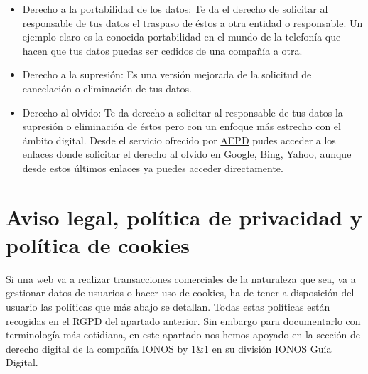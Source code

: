 \documentclass[
  spanish,
  a4paper,
  openany]{book}
\begin{document}
\begin{itemize}
\item
  Derecho a la portabilidad de los datos: Te da el derecho de solicitar al responsable de tus datos el traspaso de éstos a otra entidad o responsable. Un ejemplo claro es la conocida portabilidad en el mundo de la telefonía que hacen que tus datos puedas ser cedidos de una compañía a otra.
\item
  Derecho a la supresión: Es una versión mejorada de la solicitud de cancelación o eliminación de tus datos.
\item
  Derecho al olvido: Te da derecho a solicitar al responsable de tus datos la supresión o eliminación de éstos pero con un enfoque más estrecho con el ámbito digital. Desde el servicio ofrecido por \href{https://www.aepd.es/es/areas-de-actuacion/internet-y-redes-sociales/derecho-al-olvido}{AEPD} pudes acceder a los enlaces donde solicitar el derecho al olvido en \href{https://www.google.com/webmasters/tools/legal-removal-request?complaint_type=rtbf\&visit_id=637490694757326412-3626204680\&hl=es\&rd=1}{Google}, \href{https://www.bing.com/webmaster/tools/eu-privacy-request}{Bing}, \href{https://es.ayuda.yahoo.com/kb/Solicitud-para-bloquear-resultados-de-b\%C3\%BAsqueda-en-Yahoo-Search-Recursos-para-Residentes-Europeos-sln28252.html?guccounter=1\&guce_referrer=aHR0cHM6Ly93d3cuYWVwZC5lcy8\&guce_referrer_sig=AQAAAIRquvv_VPnIiAOniwOvZi_iVodzBg6yn2C0sGApxESxJWBR6RMqeNq89qO01lmI0UdIKSr3ivLxST8cTDrgIMQRF9FIda60jZQ16f8q85f-eqLvvviA02B_fephtV40QIGV7aQ8Uw0M7f_poDUONOrmeKQzbahKvnuKZCoBDBFQ}{Yahoo}, aunque desde estos últimos enlaces ya puedes acceder directamente.
\end{itemize}

\hypertarget{aviso-legal-poluxedtica-de-privacidad-y-poluxedtica-de-cookies}{%
\section{Aviso legal, política de privacidad y política de cookies}\label{aviso-legal-poluxedtica-de-privacidad-y-poluxedtica-de-cookies}}

Si una web va a realizar transacciones comerciales de la naturaleza que sea, va a gestionar datos de usuarios o hacer uso de cookies, ha de tener a disposición del usuario las políticas que más abajo se detallan. Todas estas políticas están recogidas en el RGPD del apartado anterior. Sin embargo para documentarlo con terminología más cotidiana, en este apartado nos hemos apoyado en la sección de derecho digital de la compañía IONOS by 1\&1 en su división IONOS Guía Digital.
\end{document}
